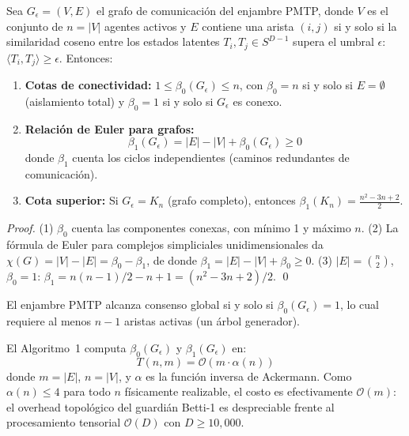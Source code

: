 \begin{lemma}

Sea $G_\epsilon = (V, E)$ el grafo de comunicación del enjambre PMTP, donde
$V$ es el conjunto de $n = |V|$ agentes activos y $E$ contiene una arista
$(i, j)$ si y solo si la similaridad coseno entre los estados latentes
$T_i, T_j \in S^{D-1}$ supera el umbral $\epsilon$:
$\langle T_i, T_j \rangle \geq \epsilon$. Entonces:
\begin{enumerate}
    \item \textbf{Cotas de conectividad:} 
    $1 \leq \beta_0(G_\epsilon) \leq n$, con $\beta_0 = n$ si y solo si 
    $E = \emptyset$ (aislamiento total) y $\beta_0 = 1$ si y solo si 
    $G_\epsilon$ es conexo.
    
    \item \textbf{Relación de Euler para grafos:}
    \begin{equation}
    \beta_1(G_\epsilon) = |E| - |V| + \beta_0(G_\epsilon) \geq 0
    \end{equation}
    donde $\beta_1$ cuenta los ciclos independientes (caminos 
    redundantes de comunicación).
    
    \item \textbf{Cota superior:} Si $G_\epsilon = K_n$ 
    (grafo completo), entonces 
    $\beta_1(K_n) = \frac{n^2 - 3n + 2}{2}$.
\end{enumerate}
\end{lemma}

\begin{proof}
(1) $\beta_0$ cuenta las componentes conexas, con mínimo 1 y máximo $n$.
(2) La fórmula de Euler para complejos simpliciales unidimensionales da 
$\chi(G) = |V| - |E| = \beta_0 - \beta_1$, de donde 
$\beta_1 = |E| - |V| + \beta_0 \geq 0$.
(3) $|E| = \binom{n}{2}$, $\beta_0 = 1$:
$\beta_1 = n(n-1)/2 - n + 1 = (n^2 - 3n + 2)/2$. \qed
\end{proof}

\begin{corollary}

El enjambre PMTP alcanza consenso global si y solo si 
$\beta_0(G_\epsilon) = 1$, lo cual requiere al menos $n - 1$ aristas
activas (un árbol generador).
\end{corollary}

\begin{lemma}

El Algoritmo~1 computa $\beta_0(G_\epsilon)$ y $\beta_1(G_\epsilon)$ en:
\begin{equation}
T(n, m) = \mathcal{O}(m \cdot \alpha(n))
\end{equation}
donde $m = |E|$, $n = |V|$, y $\alpha$ es la función inversa de Ackermann.
Como $\alpha(n) \leq 4$ para todo $n$ físicamente realizable, el costo es
efectivamente $\mathcal{O}(m)$: el overhead topológico del guardián Betti-1 
es despreciable frente al procesamiento tensorial $\mathcal{O}(D)$ con 
$D \geq 10{,}000$.
\end{lemma}

